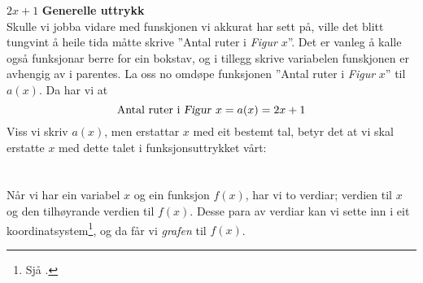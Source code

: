 \st{$ {2x+1} $}
\newpage
\textbf{Generelle uttrykk} \\
Skulle vi jobba vidare med funskjonen vi akkurat har sett på, ville det blitt tungvint å heile tida måtte skrive ''Antal ruter i \textsl{Figur }$ x $''. Det er vanleg å kalle også funksjonar berre for ein bokstav, og i tillegg skrive variabelen funskjonen er avhengig av i parentes. La oss no omdøpe funksjonen ''Antal ruter i \textsl{Figur} $ x $'' til $ a(x) $. Da har vi at
\[ \text{Antal ruter i \textsl{Figur }}x=a(x)=2x+1 \]
Viss vi skriv $ a(x) $, men erstattar $ x $ med eit bestemt tal, betyr det at vi skal erstatte $ x $ med dette talet i funksjonsuttrykket vårt:
\newpage
{}
\section{\lingraf}
Når vi har ein variabel $ x $ og ein funksjon $ f(x)  $, har vi to verdiar; verdien til $ x $ og den tilhøyrande verdien til $ f(x) $. Desse para av verdiar kan vi sette inn i eit koordinatsystem\footnote{Sjå .}, og da får vi \textit{grafen} til $ f(x) $. \vsk

